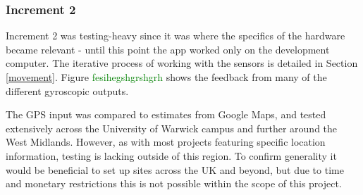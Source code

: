 \documentclass{article}
\newcommand{\could}[1]{\textcolor{green}{#1}}
\begin{document}
\subsubsection{Increment 2}
Increment 2 was testing-heavy since it was where the specifics of the hardware became relevant - until this point the app worked only on the development computer. The iterative process of working with the sensors is detailed in Section \ref{movement}. Figure \could{fesihegshgrshgrh} shows the feedback from many of the different gyroscopic outputs.

The GPS input was compared to estimates from Google Maps, and tested extensively across the University of Warwick campus and further around the West Midlands. However, as with most projects featuring specific location information, testing is lacking outside of this region. To confirm generality it would be beneficial to set up sites across the UK and beyond, but due to time and monetary restrictions this is not possible within the scope of this project.
\end{document}
